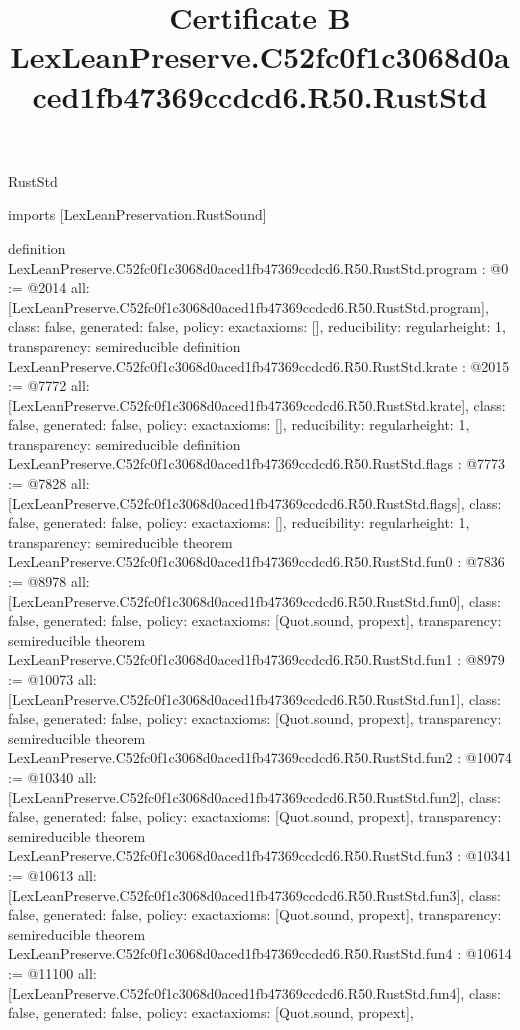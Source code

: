 \begin{lexlean}{RustStd}
\title{Certificate B LexLeanPreserve.C52fc0f1c3068d0aced1fb47369ccdcd6.R50.RustStd}
\begin{coremodule}
imports [LexLeanPreservation.RustSound]

definition LexLeanPreserve.C52fc0f1c3068d0aced1fb47369ccdcd6.R50.RustStd.program : @0 := @2014 {
  all: [LexLeanPreserve.C52fc0f1c3068d0aced1fb47369ccdcd6.R50.RustStd.program],
  class: false,
  generated: false,
  policy: exact{axioms: []},
  reducibility: regular{height: 1},
  transparency: semireducible
}
definition LexLeanPreserve.C52fc0f1c3068d0aced1fb47369ccdcd6.R50.RustStd.krate : @2015 := @7772 {
  all: [LexLeanPreserve.C52fc0f1c3068d0aced1fb47369ccdcd6.R50.RustStd.krate],
  class: false,
  generated: false,
  policy: exact{axioms: []},
  reducibility: regular{height: 1},
  transparency: semireducible
}
definition LexLeanPreserve.C52fc0f1c3068d0aced1fb47369ccdcd6.R50.RustStd.flags : @7773 := @7828 {
  all: [LexLeanPreserve.C52fc0f1c3068d0aced1fb47369ccdcd6.R50.RustStd.flags],
  class: false,
  generated: false,
  policy: exact{axioms: []},
  reducibility: regular{height: 1},
  transparency: semireducible
}
theorem LexLeanPreserve.C52fc0f1c3068d0aced1fb47369ccdcd6.R50.RustStd.fun0 : @7836 := @8978 {
  all: [LexLeanPreserve.C52fc0f1c3068d0aced1fb47369ccdcd6.R50.RustStd.fun0],
  class: false,
  generated: false,
  policy: exact{axioms: [Quot.sound, propext]},
  transparency: semireducible
}
theorem LexLeanPreserve.C52fc0f1c3068d0aced1fb47369ccdcd6.R50.RustStd.fun1 : @8979 := @10073 {
  all: [LexLeanPreserve.C52fc0f1c3068d0aced1fb47369ccdcd6.R50.RustStd.fun1],
  class: false,
  generated: false,
  policy: exact{axioms: [Quot.sound, propext]},
  transparency: semireducible
}
theorem LexLeanPreserve.C52fc0f1c3068d0aced1fb47369ccdcd6.R50.RustStd.fun2 : @10074 := @10340 {
  all: [LexLeanPreserve.C52fc0f1c3068d0aced1fb47369ccdcd6.R50.RustStd.fun2],
  class: false,
  generated: false,
  policy: exact{axioms: [Quot.sound, propext]},
  transparency: semireducible
}
theorem LexLeanPreserve.C52fc0f1c3068d0aced1fb47369ccdcd6.R50.RustStd.fun3 : @10341 := @10613 {
  all: [LexLeanPreserve.C52fc0f1c3068d0aced1fb47369ccdcd6.R50.RustStd.fun3],
  class: false,
  generated: false,
  policy: exact{axioms: [Quot.sound, propext]},
  transparency: semireducible
}
theorem LexLeanPreserve.C52fc0f1c3068d0aced1fb47369ccdcd6.R50.RustStd.fun4 : @10614 := @11100 {
  all: [LexLeanPreserve.C52fc0f1c3068d0aced1fb47369ccdcd6.R50.RustStd.fun4],
  class: false,
  generated: false,
  policy: exact{axioms: [Quot.sound, propext]},
}
\end{coremodule}
\end{lexlean}
